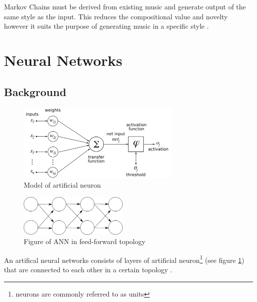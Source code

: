 Markov Chains must be derived from existing music and generate output of the same style as the input. This reduces the compositional value and novelty however it suits the purpose of generating music in a specific style \cite{Jarvelainen2000}.




\section{Neural Networks}
\subsection{Background}
\begin{figure}
\center
\includegraphics[width=300px]{../images/ANN_neuron.png}
\caption{Model of artificial neuron}
\label{ims:ANN_neuron}
\end{figure}
\begin{figure}
\centerline{\includegraphics[width=200px]{../images/ANN_feedforward.png}}
\caption{Figure of ANN in feed-forward topology}
\label{ims:ANN_FF}
\end{figure}
An artifical neural networks consists of layers of artificial neuron\footnote{neurons are commonly referred to as units} (see figure \ref{ims:ANN_neuron}) that are connected to each other in a certain topology \cite{bishop1995neural}.

